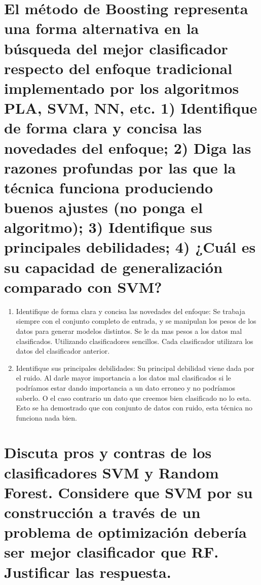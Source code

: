 \documentclass[titlepage]{article}
\begin{document}
\section{El método de Boosting representa una forma alternativa en la búsqueda del mejor clasificador respecto del enfoque tradicional implementado por los algoritmos PLA, SVM, NN, etc. 1) Identifique de forma clara y concisa las novedades del enfoque; 2) Diga las razones profundas por las que la técnica funciona produciendo buenos ajustes (no ponga el algoritmo); 3) Identifique sus principales debilidades; 4) ¿Cuál es su capacidad de generalización comparado con SVM?}
\begin{enumerate}
	\item{Identifique de forma clara y concisa las novedades del enfoque:}  Se trabaja siempre con el conjunto completo de entrada, y se manipulan los pesos de los datos para generar modelos distintos. Se le da mas pesos a los datos mal clasificados. Utilizando clasificadores sencillos. Cada clasificador utilizara los datos del clasificador anterior.
	
	\item{ Identifique sus principales debilidades:} Su principal debilidad viene dada por el ruido. Al darle mayor importancia a los datos mal clasificados si le podríamos estar dando importancia a un dato erroneo y no podríamos saberlo. O el caso contrario un dato que creemos bien clasificado no lo esta. Esto se ha demostrado que con conjunto de datos con ruido, esta técnica no funciona nada bien.
\end{enumerate}
\section{Discuta pros y contras de los clasificadores SVM y Random Forest. Considere que SVM por su construcción a través de un problema de optimización debería ser mejor clasificador que RF. Justificar las respuesta.}
\end{document}
